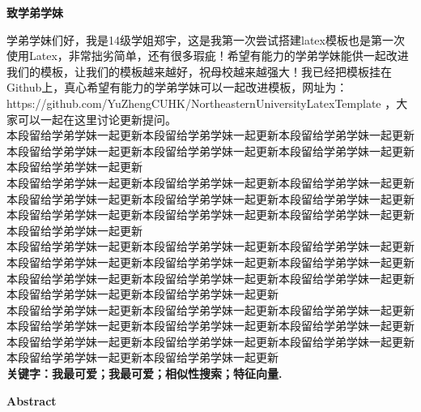\documentclass[a4paper,12pt,UTF8]{ctexart}
\begin{document}
\begin{spacing}{1.35}
	\begin{center}
		\large
		\textbf{致学弟学妹}
	\end{center}
\indent\indent 学弟学妹们好，我是14级学姐郑宇，这是我第一次尝试搭建latex模板也是第一次使用Latex，非常拙劣简单，还有很多瑕疵！希望有能力的学弟学妹能供一起改进我们的模板，让我们的模板越来越好，祝母校越来越强大！我已经把模板挂在Github上，真心希望有能力的学弟学妹可以一起改进模板，网址为：https://github.com/YuZhengCUHK/NortheasternUniversityLatexTemplate ，大家可以一起在这里讨论更新提问。
\\\indent 本段留给学弟学妹一起更新本段留给学弟学妹一起更新本段留给学弟学妹一起更新本段留给学弟学妹一起更新本段留给学弟学妹一起更新本段留给学弟学妹一起更新本段留给学弟学妹一起更新
\\\indent 本段留给学弟学妹一起更新本段留给学弟学妹一起更新本段留给学弟学妹一起更新本段留给学弟学妹一起更新本段留给学弟学妹一起更新本段留给学弟学妹一起更新本段留给学弟学妹一起更新本段留给学弟学妹一起更新本段留给学弟学妹一起更新本段留给学弟学妹一起更新
\\\indent 本段留给学弟学妹一起更新本段留给学弟学妹一起更新本段留给学弟学妹一起更新本段留给学弟学妹一起更新本段留给学弟学妹一起更新本段留给学弟学妹一起更新本段留给学弟学妹一起更新本段留给学弟学妹一起更新本段留给学弟学妹一起更新本段留给学弟学妹一起更新本段留给学弟学妹一起更新
\\\indent 本段留给学弟学妹一起更新本段留给学弟学妹一起更新本段留给学弟学妹一起更新本段留给学弟学妹一起更新本段留给学弟学妹一起更新本段留给学弟学妹一起更新本段留给学弟学妹一起更新本段留给学弟学妹一起更新本段留给学弟学妹一起更新本段留给学弟学妹一起更新本段留给学弟学妹一起更新
\\\textbf{关键字：我最可爱；我最可爱；相似性搜索；特征向量.}
\clearpage
{} 
\end{spacing}
	\begin{center}
	\large
	\textbf{Abstract}
\end{center}
\end{document}
